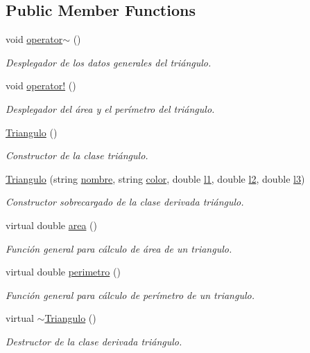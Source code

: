 \subsection*{Public Member Functions}
\begin{DoxyCompactItemize}
\item 
void \hyperlink{class_triangulo_af7fc480161706ec74ece32e9ef1fed7f}{operator$\sim$} ()
\begin{DoxyCompactList}\small\item\em Desplegador de los datos generales del triángulo. \end{DoxyCompactList}\item 
void \hyperlink{class_triangulo_ae0552ffa9641d36e1f571349e5de1070}{operator!} ()
\begin{DoxyCompactList}\small\item\em Desplegador del área y el perímetro del triángulo. \end{DoxyCompactList}\item 
\hyperlink{class_triangulo_a905d421bd19655a979ccad9e2998db0c}{Triangulo} ()
\begin{DoxyCompactList}\small\item\em Constructor de la clase triángulo. \end{DoxyCompactList}\item 
\hyperlink{class_triangulo_a5e645fd973d591e7c3d28bc74441787e}{Triangulo} (string \hyperlink{class_triangulo_a92bbfa4ca7bc38489e7bddd797a84cbf}{nombre}, string \hyperlink{class_triangulo_a437071d8f69923add54c5bedb74cce10}{color}, double \hyperlink{class_triangulo_a94ad3aafb95afd65f39dabc310b76209}{l1}, double \hyperlink{class_triangulo_a3aaa40dc5acbbd4079362c71a03cf016}{l2}, double \hyperlink{class_triangulo_aed89ff9f36a51cb7860f3175384c02eb}{l3})
\begin{DoxyCompactList}\small\item\em Constructor sobrecargado de la clase derivada triángulo. \end{DoxyCompactList}\item 
virtual double \hyperlink{class_triangulo_a1c71a04df8caa1bcb52898636fb20004}{area} ()
\begin{DoxyCompactList}\small\item\em Función general para cálculo de área de un triangulo. \end{DoxyCompactList}\item 
virtual double \hyperlink{class_triangulo_a6f5c542675a726b35f48f953bb2d9acf}{perimetro} ()
\begin{DoxyCompactList}\small\item\em Función general para cálculo de perímetro de un triangulo. \end{DoxyCompactList}\item 
virtual \hyperlink{class_triangulo_aca2be15b19831e8d7a5331808f5c1958}{$\sim$\+Triangulo} ()
\begin{DoxyCompactList}\small\item\em Destructor de la clase derivada triángulo. \end{DoxyCompactList}\end{DoxyCompactItemize}
